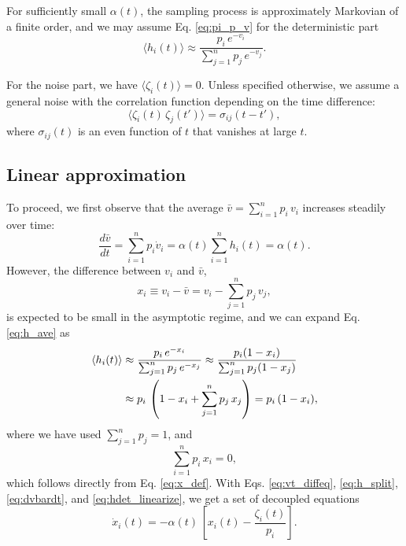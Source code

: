 \documentclass[reprint]{revtex4-1}
\begin{document}
For sufficiently small $\alpha(t)$,
the sampling process is approximately
Markovian of a finite order,
and we may assume Eq. \eqref{eq:pi_p_v}
for the deterministic part
%
\begin{equation}
  \langle h_i(t) \rangle
  \approx
  \frac{ p_i \, e^{-v_i} }
  { \sum_{j = 1}^n p_j \, e^{-v_j} }.
  \label{eq:h_ave}
\end{equation}



For the noise part, we have
$\langle \zeta_i(t) \rangle = 0$.
%
Unless specified otherwise, we assume
a general noise with the correlation
function depending on the time difference:
%
\begin{equation}
  \langle \zeta_i(t) \, \zeta_j(t') \rangle
  =
  \sigma_{ij}(t - t'),
  \label{eq:zeta_zeta_correlation}
\end{equation}
%
where $\sigma_{ij}(t)$ is an even function of $t$
that vanishes at large $t$.



\subsection{Linear approximation}



To proceed, we first observe that
the average $\bar v = \sum_{i = 1}^n p_i \, v_i$
increases steadily over time:
%
\begin{equation}
\frac{ d \bar v } { d t }
=
\sum_{i = 1}^n p_i \dot v_i
=
\alpha(t) \sum_{i = 1}^n h_i(t) = \alpha(t).
\label{eq:dvbardt}
\end{equation}
%
However, the difference between $v_i$ and $\bar v$,
%
\begin{equation}
  x_i \equiv v_i - \bar v = v_i - \sum_{j = 1}^n p_j \, v_j,
  \label{eq:x_def}
\end{equation}
%
is expected to be small in the asymptotic regime,
and we can expand Eq. \eqref{eq:h_ave} as
\begin{align}
\langle h_i(t) \rangle
&\approx
\frac{ p_i \, e^{- x_i} }
{ \sum_{ j = 1}^n p_j \, e^{- x_j} }
\approx
\frac{ p_i ( 1 - x_i ) }
{ \sum_{ j = 1}^n p_j (1 - x_j) }
\notag \\
&\approx
p_i \, \left(
  1 - x_i + \sum_{j=1}^n p_j \, x_j
\right)
=
p_i \, (1 - x_i),
\label{eq:hdet_linearize}
\end{align}
where we have used $\sum_{j=1}^n p_j = 1$,
and
%
\begin{equation}
  \sum_{i = 1}^n p_i \, x_i = 0,
  \label{eq:px_sum}
\end{equation}
which follows directly from Eq. \eqref{eq:x_def}.
%
With Eqs.
\eqref{eq:vt_diffeq},
\eqref{eq:h_split},
\eqref{eq:dvbardt},
and
\eqref{eq:hdet_linearize},
we get a set of decoupled equations
%
\begin{equation}
  \dot x_i(t)
  =
  -\alpha(t) \, \left[ x_i(t) - \frac{ \zeta_i(t) } { p_i } \right].
  \label{eq:dxdt_WL}
\end{equation}
\end{document}
